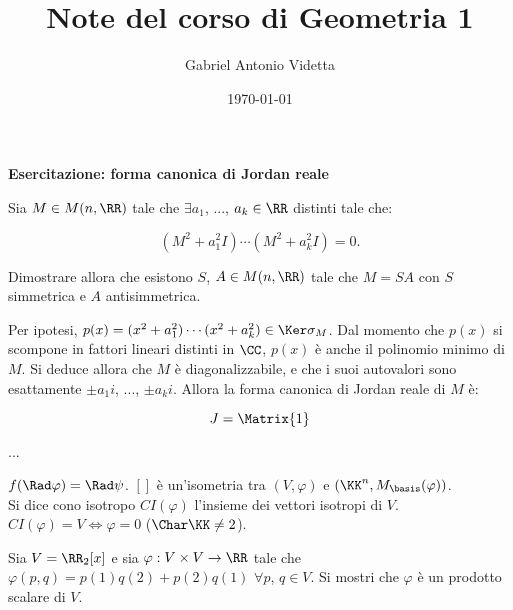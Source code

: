 \documentclass[11pt]{article}
\title{\textbf{Note del corso di Geometria 1}}
\author{Gabriel Antonio Videtta}
\date{\today}
\begin{document}
	
	\maketitle
	
	\begin{center}
		\Large \textbf{Esercitazione: forma canonica di Jordan reale}
	\end{center}

	\wip

	\begin{exercise}
		Sia $M \in M(n, \RR)$ tale che $\exists a_1$, ..., $a_k \in \RR$ distinti
		tale che:
		
		\[ (M^2 + a_1^2 I) \cdots (M^2 + a_k^2 I) = 0. \]
		
		Dimostrare allora che esistono $S$, $A \in M(n, \RR)$ tale che
		$M = SA$ con $S$ simmetrica e $A$ antisimmetrica.
	\end{exercise}

	\begin{solution}
		Per ipotesi, $p(x) = (x^2+a_1^2) \cdots (x^2 + a_k^2) \in \Ker \sigma_M$.
		Dal momento che $p(x)$ si scompone in fattori lineari distinti in
		$\CC$, $p(x)$ è anche il polinomio minimo di $M$. Si deduce
		allora che $M$ è diagonalizzabile, e che i suoi autovalori sono
		esattamente $\pm a_1 i$, ..., $\pm a_k i$. Allora la forma
		canonica di Jordan reale di $M$ è:
		
		\[ J = \Matrix{1} \]
		
		... \\
	\end{solution}

	\begin{remark}\nl
		\li $f(\Rad \varphi) = \Rad \psi$.
		\li $[]$ è un'isometria tra $(V, \varphi)$ e $(\KK^n, M_\basis(\varphi))$.
		\\ Si dice cono isotropo $CI(\varphi)$ l'insieme dei vettori
		isotropi di $V$. $CI(\varphi) = V \iff \varphi = 0$ ($\Char \KK\neq 2$).
	\end{remark}

	\begin{exercise}
		Sia $V = \RR_2[x]$ e sia $\varphi : V \times V \to \RR$ tale che
		$\varphi(p, q) = p(1) q(2) + p(2) q(1)$ $\forall p$, $q \in V$.
		Si mostri che $\varphi$ è un prodotto scalare di $V$.
	\end{exercise}
\end{document}
